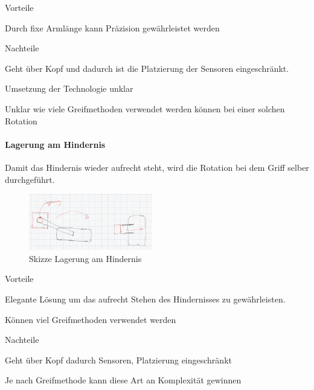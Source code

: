 \documentclass[../main.tex]{subfiles}
\begin{document}
\begin{minipage}[t]{0.48\textwidth}
    \begin{items}
          \item [Vorteile]
          \item Durch fixe Armlänge kann Präzision gewährleistet werden
    \end{items}
\end{minipage}
\hfill
\begin{minipage}[t]{0.48\textwidth}
    \begin{items}
          \item [Nachteile]
          \item Geht über Kopf und dadurch ist die Platzierung der Sensoren eingeschränkt.
          \item Umsetzung der Technologie unklar
          \item Unklar wie viele Greifmethoden verwendet werden können bei einer solchen Rotation
    \end{items}
\end{minipage}
\newpage
\paragraph{Lagerung am Hindernis}
Damit das Hindernis wieder aufrecht steht, wird die Rotation bei dem Griff selber durchgeführt.

\begin{figure}[H]
        \centering
        \includegraphics[width=0.48\textwidth]{img/technologierecherche/Rotation/ueberkopf_objekt_gelagert.jpg}
        \caption{Skizze Lagerung am Hindernis} 
        \label{img:tech_ueberkopf_objekt_gelagert}
\end{figure}

\begin{minipage}[t]{0.48\textwidth}
    \begin{items}
          \item [Vorteile]
          \item Elegante Lösung um das aufrecht Stehen des Hindernisses zu gewährleisten.
          \item Können viel Greifmethoden verwendet werden
    \end{items}
\end{minipage}
\hfill
\begin{minipage}[t]{0.48\textwidth}
    \begin{items}
          \item [Nachteile]
          \item Geht über Kopf dadurch Sensoren, Platzierung eingeschränkt
          \item Je nach Greifmethode kann diese Art an Komplexität gewinnen
    \end{items}
\end{minipage}
\newpage
\end{document}

